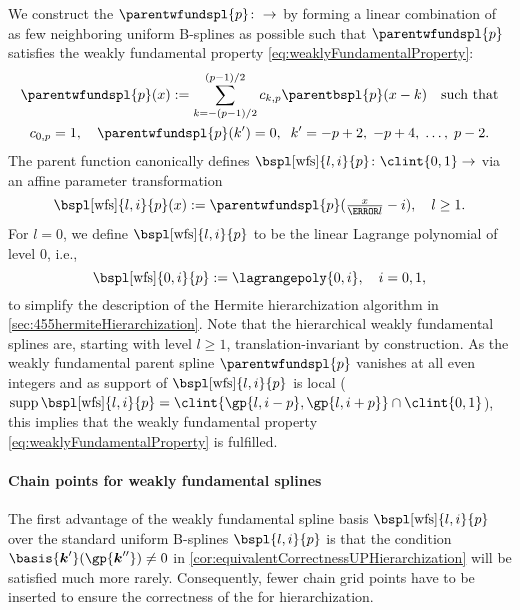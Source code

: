 We construct the 
$\parentwfundspl{p}\colon \real \to \real$
by forming a linear combination of as few neighboring
uniform B-splines as possible such that $\parentwfundspl{p}$
satisfies the weakly fundamental property
\eqref{eq:weaklyFundamentalProperty}:
\begin{subequations}
  \begin{gather}
    \parentwfundspl{p}(x)
    := \sum_{k=-(p-1)/2}^{(p-1)/2}
    \wfundsplcoeff{k}{p} \parentbspl{p}(x - k)
    \quad\text{such that}\\
    \wfundsplcoeff{0}{p} = 1,\quad
    \parentwfundspl{p}(k') = 0,\;\;
    k' = -p + 2,\; -p + 4,\; \dotsc,\; p - 2.
  \end{gather}
\end{subequations}
The parent function canonically defines
$\bspl[\wfs]{l,i}{p}\colon \clint{0, 1} \to \real$
via an affine parameter transformation
\begin{equation}
  \bspl[\wfs]{l,i}{p}(x)
  := \parentwfundspl{p}(\tfrac{x}{\ms{l}} - i),\quad
  l \ge 1.
\end{equation}
For $l = 0$, we define $\bspl[\wfs]{l,i}{p}$ to be the
linear Lagrange polynomial of level $0$, i.e.,
\begin{equation}
  \bspl[\wfs]{0,i}{p}
  := \lagrangepoly{0,i},\quad
  i = 0, 1,
\end{equation}
to simplify the description of the
Hermite hierarchization algorithm in \cref{sec:455hermiteHierarchization}.
Note that the hierarchical weakly fundamental splines are,
starting with level $l \ge 1$,
translation-invariant by construction.
As the weakly fundamental parent spline $\parentwfundspl{p}$
vanishes at all even integers and as support of $\bspl[\wfs]{l,i}{p}$ is local
($\supp \bspl[\wfs]{l,i}{p}
= \clint{\gp{l,i-p}, \gp{l,i+p}} \cap \clint{0, 1}$),
this implies that the weakly fundamental property
\eqref{eq:weaklyFundamentalProperty} is fulfilled.

\paragraph{Chain points for weakly fundamental splines}

The first advantage of the
weakly fundamental spline basis $\bspl[\wfs]{l,i}{p}$
over the standard uniform B-splines $\bspl{l,i}{p}$ is that
the condition $\basis{\*k'}(\gp{\*k''}) \not= 0$ in
\cref{cor:equivalentCorrectnessUPHierarchization} will be
satisfied much more rarely.
Consequently, fewer chain grid points have to be inserted to
ensure the correctness of the \up for hierarchization.

